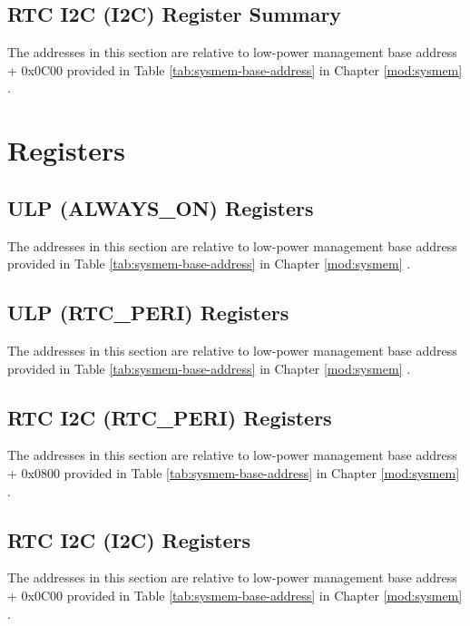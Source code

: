 \documentclass[main\_\_EN.tex]{subfiles}
\begin{document}


\subsection{RTC I2C (I2C) Register Summary}
The addresses in this section are relative to low-power management base address + 0x{}0C00 provided in Table \ref{tab:sysmem-base-address} in Chapter \ref{mod:sysmem} \textit{}.


\section{Registers}


\subsection{ULP (ALWAYS\_ON) Registers}

The addresses in this section are relative to low-power management base address provided in Table \ref{tab:sysmem-base-address} in Chapter \ref{mod:sysmem} \textit{}.



\subsection{ULP (RTC\_PERI) Registers}

The addresses in this section are relative to low-power management base address provided in Table \ref{tab:sysmem-base-address} in Chapter \ref{mod:sysmem} \textit{}.



\subsection{RTC I2C (RTC\_PERI) Registers}

The addresses in this section are relative to low-power management base address + 0x{}0800 provided in Table \ref{tab:sysmem-base-address} in Chapter \ref{mod:sysmem} \textit{}.



\subsection{RTC I2C (I2C) Registers}
The addresses in this section are relative to low-power management base address + 0x{}0C00 provided in Table \ref{tab:sysmem-base-address} in Chapter \ref{mod:sysmem} \textit{}.

\end{document}
